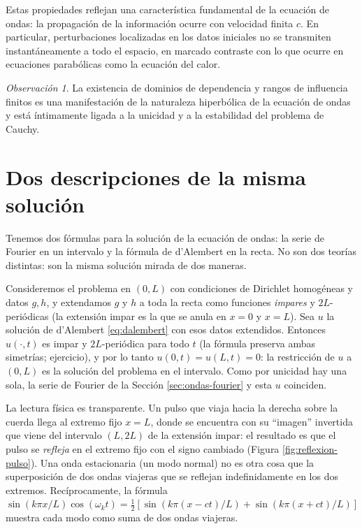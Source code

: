 \documentclass[12pt, a4paper]{amsbook}
\theoremstyle{remark}
\newtheorem{obs}[teo]{Observación}
\theoremstyle{definition}
\numberwithin{section}{chapter}
\numberwithin{subsection}{section}
\numberwithin{equation}{section}
\numberwithin{figure}{chapter}
\begin{document}
\medskip

Estas propiedades reflejan una característica fundamental de la ecuación de
ondas: la propagación de la información ocurre con velocidad finita $c$. En
particular, perturbaciones localizadas en los datos iniciales no se transmiten
instantáneamente a todo el espacio, en marcado contraste con lo que ocurre en
ecuaciones parabólicas como la ecuación del calor.

\begin{obs}
La existencia de dominios de dependencia y rangos de influencia finitos es una
manifestación de la naturaleza hiperbólica de la ecuación de ondas y está
íntimamente ligada a la unicidad y a la estabilidad del problema de Cauchy.
\end{obs}

\section{Dos descripciones de la misma solución}\label{sec:fourier-dalembert}

Tenemos dos fórmulas para la solución de la ecuación de ondas: la serie de Fourier en un intervalo y la fórmula de d'Alembert en la recta. No son dos teorías distintas: son la misma solución mirada de dos maneras.

Consideremos el problema en $(0,L)$ con condiciones de Dirichlet homogéneas y datos $g,h$, y extendamos $g$ y $h$ a toda la recta como funciones \emph{impares} y $2L$-periódicas (la extensión impar es la que se anula en $x=0$ y $x=L$). Sea $u$ la solución de d'Alembert \eqref{eq:dalembert} con esos datos extendidos. Entonces $u(\cdot,t)$ es impar y $2L$-periódica para todo $t$ (la fórmula preserva ambas simetrías; ejercicio), y por lo tanto $u(0,t)=u(L,t)=0$: la restricción de $u$ a $(0,L)$ es la solución del problema en el intervalo. Como por unicidad hay una sola, la serie de Fourier de la Sección \ref{sec:ondas-fourier} y esta $u$ coinciden.

La lectura física es transparente. Un pulso que viaja hacia la derecha sobre la cuerda llega al extremo fijo $x=L$, donde se encuentra con su ``imagen'' invertida que viene del intervalo $(L,2L)$ de la extensión impar: el resultado es que el pulso se \emph{refleja} en el extremo fijo con el signo cambiado (Figura \ref{fig:reflexion-pulso}). Una onda estacionaria (un modo normal) no es otra cosa que la superposición de dos ondas viajeras que se reflejan indefinidamente en los dos extremos. Recíprocamente, la fórmula $\sin(k\pi x/L)\cos(\omega_k t) = \frac12[\sin(k\pi(x-ct)/L) + \sin(k\pi(x+ct)/L)]$ muestra cada modo como suma de dos ondas viajeras.
\end{document}
